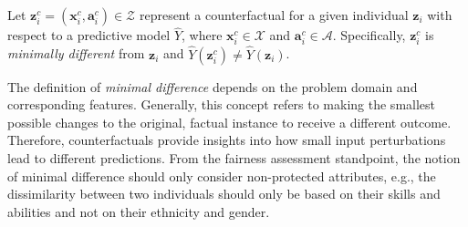 \documentclass[letterpaper]{article} %
\newtheorem{definition}{Definition}
\DeclareMathOperator*{\argmin}{arg\,min}
\begin{document}
Let $\boldsymbol{z}_i^c = (\boldsymbol{x}_i^c, \boldsymbol{a}_i^c) \in \mathcal{Z}$ represent a counterfactual for a given individual $\boldsymbol{z}_i$ with respect to a predictive model $\hat{Y}$, where $\boldsymbol{x}_i^c \in \mathcal{X}$ and $\boldsymbol{a}_i^c \in \mathcal{A}$. Specifically, $\boldsymbol{z}_i^c$ is \emph{minimally different} from $\boldsymbol{z}_i$ and $\hat{Y}(\boldsymbol{z}_i^c) \neq \hat{Y}(\boldsymbol{z}_i)$.


The definition of \emph{minimal difference} depends on the problem domain and corresponding features. Generally, this concept refers to making the smallest possible changes to the original, factual instance to receive a different outcome. Therefore, counterfactuals provide insights into how small input perturbations lead to different predictions. From the fairness assessment standpoint, the notion of minimal difference should only consider non-protected attributes, e.g., the dissimilarity between two individuals should only be based on their skills and abilities and not on their ethnicity and gender.


\end{document}
